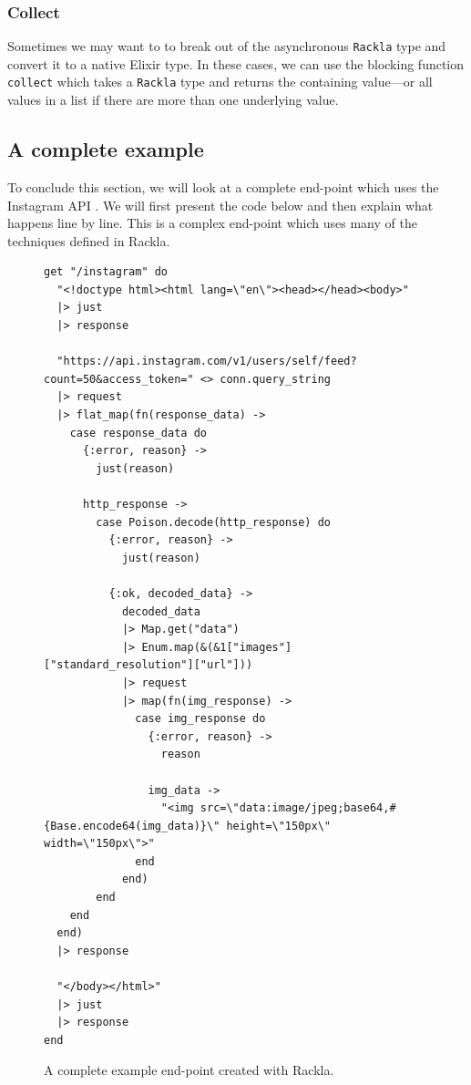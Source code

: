 \documentclass{cslthse-msc}
\begin{document}
\subsubsection{Collect}
Sometimes we may want to to break out of the asynchronous \lstinline{Rackla} type and convert it to a native Elixir type. In these cases, we can use the blocking function \lstinline{collect} which takes a \lstinline{Rackla} type and returns the containing value---or all values in a list if there are more than one underlying value.

\clearpage

\pagebreak

\subsection{A complete example}
To conclude this section, we will look at a complete end-point which uses the Instagram API \cite{instagram_api}. We will first present the code below and then explain what happens line by line. This is a complex end-point which uses many of the techniques defined in Rackla.

\begin{figure}[H]
  \centering
\begin{lstlisting}[breaklines=true,frame=single]
get "/instagram" do
  "<!doctype html><html lang=\"en\"><head></head><body>"
  |> just
  |> response

  "https://api.instagram.com/v1/users/self/feed?count=50&access_token=" <> conn.query_string
  |> request
  |> flat_map(fn(response_data) ->
    case response_data do
      {:error, reason} ->
        just(reason)
        
      http_response ->
        case Poison.decode(http_response) do
          {:error, reason} ->
            just(reason)
            
          {:ok, decoded_data} ->
            decoded_data
            |> Map.get("data")
            |> Enum.map(&(&1["images"]["standard_resolution"]["url"]))
            |> request
            |> map(fn(img_response) ->
              case img_response do
                {:error, reason} ->
                  reason
                  
                img_data ->
                  "<img src=\"data:image/jpeg;base64,#{Base.encode64(img_data)}\" height=\"150px\" width=\"150px\">"
              end
            end)
        end
    end
  end)
  |> response
  
  "</body></html>"
  |> just
  |> response
end
\end{lstlisting}
  \caption{A complete example end-point created with Rackla.}
  \label{fig:complete_end_point}
\end{figure}
\end{document}

